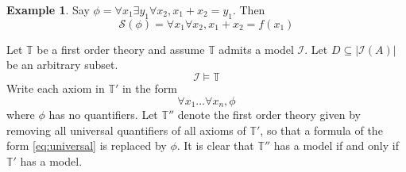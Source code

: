 \documentclass[12pt]{article}
\theoremstyle{plain}
\theoremstyle{definition}
\newtheorem{example}[thm]{Example}
\newcommand{\bb}[1]{\mathbb{#1}}
\newcommand{\call}[1]{\mathcal{#1}}
\begin{document}
	\begin{example}
		Say $\phi = \forall x_1 \exists y_1 \forall x_2, x_1 + x_2 = y_1$. Then
		\begin{equation}
			\call{S}(\phi) = \forall x_1 \forall x_2, x_1 + x_2 = f(x_1)
			\end{equation}
		\end{example}
	
	Let $\bb{T}$ be a first order theory and assume $\bb{T}$ admits a model $\call{I}$. Let $D \subseteq |\call{I}(A)|$ be an arbitrary subset.
	\begin{equation}
		\call{I} \models \bb{T}
		\end{equation}
Write each axiom in $\bb{T}'$ in the form
\begin{equation}\label{eq:universal}
	\forall x_1 \ldots \forall x_n, \phi
	\end{equation}
where $\phi$ has no quantifiers. Let $\bb{T}''$ denote the first order theory given by removing all universal quantifiers of all axioms of $\bb{T}'$, so that a formula of the form \eqref{eq:universal} is replaced by $\phi$. It is clear that $\bb{T}''$ has a model if and only if $\bb{T}'$ has a model.
\end{document}
